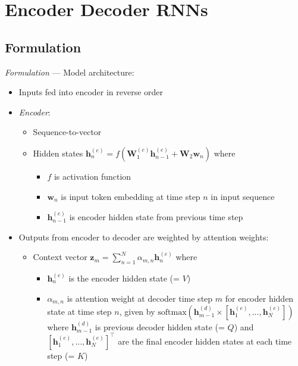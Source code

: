 \section{Encoder Decoder RNNs}
\subsection*{Formulation}
\emph{Formulation} --- 
Model architecture:
\begin{itemize}
    \item Inputs fed into encoder in reverse order
    \item \emph{Encoder}: 
    \begin{itemize}
        \item Sequence-to-vector
        \item Hidden states $\boldsymbol{h}_n^{(e)} = f ( \boldsymbol{W}_1^{(e)} \boldsymbol{h}_{n-1}^{(e)} + \boldsymbol{W}_2 \boldsymbol{w}_{n} )$ where 
        \begin{itemize}
            \item $f$ is activation function
            \item $\boldsymbol{w}_{n}$ is input token embedding at time step $n$ in input sequence
            \item $\boldsymbol{h}_{n-1}^{(e)}$ is encoder hidden state from previous time step
        \end{itemize}
    \end{itemize}
    \item Outputs from encoder to decoder are weighted by attention weights:
    \begin{itemize}
        \item Context vector $\boldsymbol{z}_m = \sum_{n=1}^N \alpha_{m,n} \boldsymbol{h}_n^{(e)}$ where 
        \begin{itemize}
            \item $\boldsymbol{h}_n^{(e)}$ is the encoder hidden state (= $V$)
            \item $\alpha_{m,n}$ is attention weight at decoder time step $m$ for encoder hidden state at time step $n$, given by $ \textrm{softmax}(\boldsymbol{h}_{m-1}^{(d)} \times [\boldsymbol{h}_1^{(e)}, ..., \boldsymbol{h}_N^{(e)}])$ where $\boldsymbol{h}_{m-1}^{(d)}$ is previous decoder hidden state (= $Q$) and $[\boldsymbol{h}_1^{(e)}, ..., \boldsymbol{h}_N^{(e)}]^\intercal$ are the final encoder hidden states at each time step (= $K$)
        \end{itemize}
    \end{itemize}

\end{itemize}
